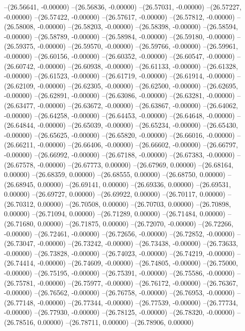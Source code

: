 --(26.56641, -0.00000)
--(26.56836, -0.00000)
--(26.57031, -0.00000)
--(26.57227, -0.00000)
--(26.57422, -0.00000)
--(26.57617, -0.00000)
--(26.57812, -0.00000)
--(26.58008, -0.00000)
--(26.58203, -0.00000)
--(26.58398, -0.00000)
--(26.58594, -0.00000)
--(26.58789, -0.00000)
--(26.58984, -0.00000)
--(26.59180, -0.00000)
--(26.59375, -0.00000)
--(26.59570, -0.00000)
--(26.59766, -0.00000)
--(26.59961, -0.00000)
--(26.60156, -0.00000)
--(26.60352, -0.00000)
--(26.60547, -0.00000)
--(26.60742, -0.00000)
--(26.60938, -0.00000)
--(26.61133, -0.00000)
--(26.61328, -0.00000)
--(26.61523, -0.00000)
--(26.61719, -0.00000)
--(26.61914, -0.00000)
--(26.62109, -0.00000)
--(26.62305, -0.00000)
--(26.62500, -0.00000)
--(26.62695, -0.00000)
--(26.62891, -0.00000)
--(26.63086, -0.00000)
--(26.63281, -0.00000)
--(26.63477, -0.00000)
--(26.63672, -0.00000)
--(26.63867, -0.00000)
--(26.64062, -0.00000)
--(26.64258, -0.00000)
--(26.64453, -0.00000)
--(26.64648, -0.00000)
--(26.64844, -0.00000)
--(26.65039, -0.00000)
--(26.65234, -0.00000)
--(26.65430, -0.00000)
--(26.65625, -0.00000)
--(26.65820, -0.00000)
--(26.66016, -0.00000)
--(26.66211, -0.00000)
--(26.66406, -0.00000)
--(26.66602, -0.00000)
--(26.66797, -0.00000)
--(26.66992, -0.00000)
--(26.67188, -0.00000)
--(26.67383, -0.00000)
--(26.67578, -0.00000)
--(26.67773, 0.00000)
--(26.67969, 0.00000)
--(26.68164, 0.00000)
--(26.68359, 0.00000)
--(26.68555, 0.00000)
--(26.68750, 0.00000)
--(26.68945, 0.00000)
--(26.69141, 0.00000)
--(26.69336, 0.00000)
--(26.69531, 0.00000)
--(26.69727, 0.00000)
--(26.69922, 0.00000)
--(26.70117, 0.00000)
--(26.70312, 0.00000)
--(26.70508, 0.00000)
--(26.70703, 0.00000)
--(26.70898, 0.00000)
--(26.71094, 0.00000)
--(26.71289, 0.00000)
--(26.71484, 0.00000)
--(26.71680, 0.00000)
--(26.71875, 0.00000)
--(26.72070, -0.00000)
--(26.72266, -0.00000)
--(26.72461, -0.00000)
--(26.72656, -0.00000)
--(26.72852, -0.00000)
--(26.73047, -0.00000)
--(26.73242, -0.00000)
--(26.73438, -0.00000)
--(26.73633, -0.00000)
--(26.73828, -0.00000)
--(26.74023, -0.00000)
--(26.74219, -0.00000)
--(26.74414, -0.00000)
--(26.74609, -0.00000)
--(26.74805, -0.00000)
--(26.75000, -0.00000)
--(26.75195, -0.00000)
--(26.75391, -0.00000)
--(26.75586, -0.00000)
--(26.75781, -0.00000)
--(26.75977, -0.00000)
--(26.76172, -0.00000)
--(26.76367, -0.00000)
--(26.76562, -0.00000)
--(26.76758, -0.00000)
--(26.76953, -0.00000)
--(26.77148, -0.00000)
--(26.77344, -0.00000)
--(26.77539, -0.00000)
--(26.77734, -0.00000)
--(26.77930, -0.00000)
--(26.78125, -0.00000)
--(26.78320, -0.00000)
--(26.78516, 0.00000)
--(26.78711, 0.00000)
--(26.78906, 0.00000)
